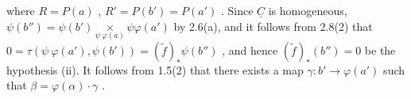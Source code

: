 \begin{center}
\end{center}
where  $R = P(a)$ , $R' = P(b') = P(a')$ . Since $\underline{C}$ is homogeneous, $\psi(b'') = \psi(b') \underset{\psi\ \varphi(a)}{\times} \psi\varphi(a')$ by 2.6(a), and it follows from 2.8(2) that $0 = \tau(\psi\ \varphi(a'), \psi(b')) = (\widetilde{f})_{*}\psi(b'')$ , and hence $(\widetilde{f})_{*}(b'') = 0$ be the hypothesis (ii). It follows from 1.5(2) that there exists a map $\gamma : b' \longrightarrow \varphi(a')$ such that $\beta = \varphi(\alpha)\cdot\gamma$ .

